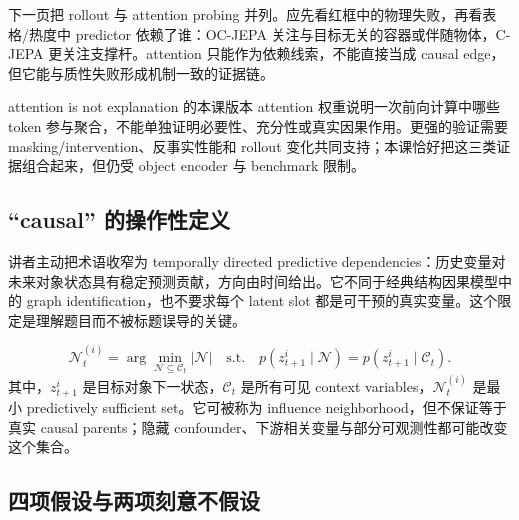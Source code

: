 
下一页把 rollout 与 attention probing 并列。应先看红框中的物理失败，再看表格/热度中 predictor 依赖了谁：OC-JEPA 关注与目标无关的容器或伴随物体，C-JEPA 更关注支撑杆。attention 只能作为依赖线索，不能直接当成 causal edge，但它能与质性失败形成机制一致的证据链。



\begin{warningbox}{attention is not explanation 的本课版本}
attention 权重说明一次前向计算中哪些 token 参与聚合，不能单独证明必要性、充分性或真实因果作用。更强的验证需要 masking/intervention、反事实性能和 rollout 变化共同支持；本课恰好把这三类证据组合起来，但仍受 object encoder 与 benchmark 限制。
\end{warningbox}

\subsection{``causal'' 的操作性定义}

讲者主动把术语收窄为 temporally directed predictive dependencies：历史变量对未来对象状态具有稳定预测贡献，方向由时间给出。它不同于经典结构因果模型中的 graph identification，也不要求每个 latent slot 都是可干预的真实变量。这个限定是理解题目而不被标题误导的关键。


\[
\mathcal{N}_t^{(i)}
=\arg\min_{\mathcal{N}\subseteq\mathcal{C}_t}
|\mathcal{N}|
\quad\text{s.t.}\quad
p(z_{t+1}^i\mid\mathcal{N})
=p(z_{t+1}^i\mid\mathcal{C}_t).
\]
其中，$z_{t+1}^i$ 是目标对象下一状态，$\mathcal{C}_t$ 是所有可见 context variables，$\mathcal{N}_t^{(i)}$ 是最小 predictively sufficient set。它可被称为 influence neighborhood，但不保证等于真实 causal parents；隐藏 confounder、下游相关变量与部分可观测性都可能改变这个集合。

\subsection{四项假设与两项刻意不假设}

